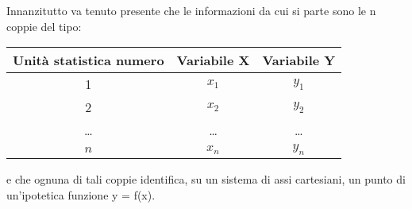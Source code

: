  Innanzitutto va tenuto presente che le informazioni da cui si parte sono 
le n coppie del tipo:

 \begin{tabular}{|c|c|c|}
        \hline
        Unità statistica numero &       Variabile X&    Variabile Y\\\hline
        1&      $x_1$&  $y_1$\\\hline
        2&      $x_2$&  $y_2$\\\hline
        \dots&  \dots&\dots\\\hline
        $n$&    $x_n$&  $y_n$\\\hline
 \end{tabular}
 
 e che ognuna di tali coppie identifica, su un sistema di assi cartesiani, 
un punto di un'ipotetica funzione y = f(x).
 
